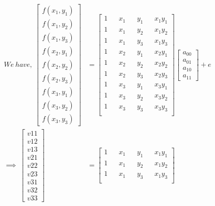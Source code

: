 \documentclass[a4paper,fleqn,11pt]{article}
\theoremstyle{mytheor}
\begin{document}
\begin{align}
We\ have,\ \begin{bmatrix}
				f(x_1, y_1) \\
				f(x_1, y_2) \\
				f(x_1, y_3) \\
				f(x_2, y_1) \\
				f(x_2, y_2) \\
				f(x_2, y_3) \\
				f(x_3, y_1) \\
				f(x_3, y_2) \\
				f(x_3, y_3)
			\end{bmatrix} & = 
			\begin{bmatrix}
				1 && x_1 &&	y_1 && x_1y_1 \\
				1 && x_1 &&	y_2 && x_1y_2 \\
				1 && x_1 &&	y_3 && x_1y_3 \\
				1 && x_2 &&	y_1 && x_2y_1 \\
				1 && x_2 &&	y_2 && x_2y_2 \\
				1 && x_2 &&	y_3 && x_2y_3 \\
				1 && x_3 &&	y_1 && x_3y_1 \\
				1 && x_3 &&	y_2 && x_3y_2 \\
				1 && x_3 &&	y_3 && x_3y_3 \\
			\end{bmatrix}
			\begin{bmatrix}
				a_{00} \\
				a_{01} \\
				a_{10} \\
				a_{11}	
			\end{bmatrix} + e \\
\implies\ \begin{bmatrix}
				v{11} \\
				v{12} \\
				v{13} \\
				v{21} \\
				v{22} \\
				v{23} \\
				v{31} \\
				v{32} \\
				v{33}
			\end{bmatrix} & = 
			\begin{bmatrix}
				1 && x_1 &&	y_1 && x_1y_1 \\
				1 && x_1 &&	y_2 && x_1y_2 \\
				1 && x_1 &&	y_3 && x_1y_3 \\

\end{bmatrix}
\end{align}
\end{document}
